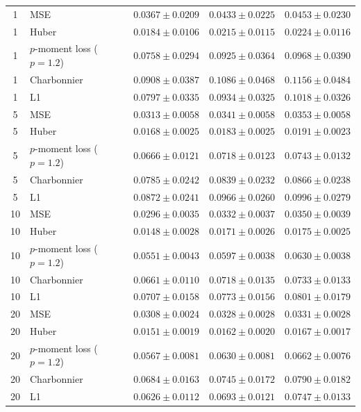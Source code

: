 \label{tab:stagewise_gradient_tails}
\begin{table}
\begin{tabular}{@{}clccc@{}}
1 & MSE & $0.0367\pm0.0209$ & $0.0433\pm0.0225$ & $0.0453\pm0.0230$ \\
1 & Huber & $0.0184\pm0.0106$ & $0.0215\pm0.0115$ & $0.0224\pm0.0116$ \\
1 & $p$-moment loss ($p=1.2$) & $0.0758\pm0.0294$ & $0.0925\pm0.0364$ & $0.0968\pm0.0390$ \\
1 & Charbonnier & $0.0908\pm0.0387$ & $0.1086\pm0.0468$ & $0.1156\pm0.0484$ \\
1 & L1 & $0.0797\pm0.0335$ & $0.0934\pm0.0325$ & $0.1018\pm0.0326$ \\
5 & MSE & $0.0313\pm0.0058$ & $0.0341\pm0.0058$ & $0.0353\pm0.0058$ \\
5 & Huber & $0.0168\pm0.0025$ & $0.0183\pm0.0025$ & $0.0191\pm0.0023$ \\
5 & $p$-moment loss ($p=1.2$) & $0.0666\pm0.0121$ & $0.0718\pm0.0123$ & $0.0743\pm0.0132$ \\
5 & Charbonnier & $0.0785\pm0.0242$ & $0.0839\pm0.0232$ & $0.0866\pm0.0238$ \\
5 & L1 & $0.0872\pm0.0241$ & $0.0966\pm0.0260$ & $0.0996\pm0.0279$ \\
10 & MSE & $0.0296\pm0.0035$ & $0.0332\pm0.0037$ & $0.0350\pm0.0039$ \\
10 & Huber & $0.0148\pm0.0028$ & $0.0171\pm0.0026$ & $0.0175\pm0.0025$ \\
10 & $p$-moment loss ($p=1.2$) & $0.0551\pm0.0043$ & $0.0597\pm0.0038$ & $0.0630\pm0.0038$ \\
10 & Charbonnier & $0.0661\pm0.0110$ & $0.0718\pm0.0135$ & $0.0733\pm0.0133$ \\
10 & L1 & $0.0707\pm0.0158$ & $0.0773\pm0.0156$ & $0.0801\pm0.0179$ \\
20 & MSE & $0.0308\pm0.0024$ & $0.0328\pm0.0028$ & $0.0331\pm0.0028$ \\
20 & Huber & $0.0151\pm0.0019$ & $0.0162\pm0.0020$ & $0.0167\pm0.0017$ \\
20 & $p$-moment loss ($p=1.2$) & $0.0567\pm0.0081$ & $0.0630\pm0.0081$ & $0.0662\pm0.0076$ \\
20 & Charbonnier & $0.0684\pm0.0163$ & $0.0745\pm0.0172$ & $0.0790\pm0.0182$ \\
20 & L1 & $0.0626\pm0.0112$ & $0.0693\pm0.0121$ & $0.0747\pm0.0133$ \\
\end{tabular}
\end{table}

